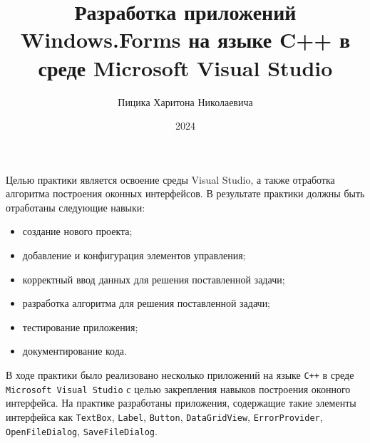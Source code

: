 \documentclass[bachelor, och, pract]{SCWorks}
\begin{document}
\title{Разработка приложений Windows.Forms на языке C++ в
среде Microsoft Visual Studio}

\author{Пицика Харитона Николаевича}





\date{2024}
\maketitle

\tableofcontents

\intro
Целью практики является освоение среды Visual Studio, а также отработка алгоритма 
построения оконных интерфейсов. В результате практики должны быть отработаны следующие навыки:
\begin{itemize}
    \item создание нового проекта;
    \item добавление и конфигурация элементов управления;
    \item корректный ввод данных для решения поставленной задачи;
    \item разработка алгоритма для решения поставленной задачи;
    \item тестирование приложения;
    \item документирование кода.
\end{itemize}







\conclusion
В ходе практики было реализовано несколько приложений на языке \verb|C++|
в среде \verb|Microsoft Visual Studio| с целью закрепления навыков построения оконного интерфейса. 
На практике разработаны приложения, содержащие такие
элементы интерфейса как \verb|TextBox|, \verb|Label|, \verb|Button|, 
\verb|DataGridView|, \verb|ErrorProvider|, \newline
\verb|OpenFileDialog|, \verb|SaveFileDialog|. 
\newpage




\appendix


\end{document}
